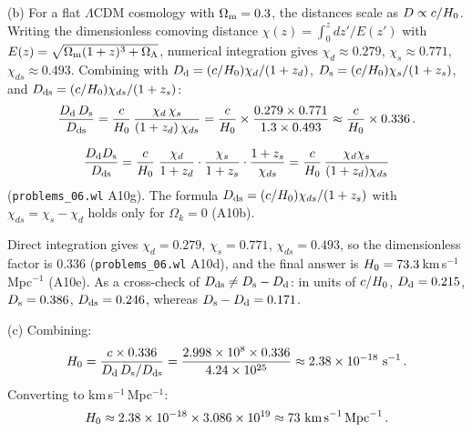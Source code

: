 (b) For a flat $\Lambda$CDM cosmology with $\Omega_{\mathrm{m}} = 0.3$, the
distances scale as $D \propto c / H_0$.  Writing the
dimensionless comoving distance $\chi(z) = \int_0^z dz'/E(z')$ with
$E(z) = \sqrt{\Omega_{\mathrm{m}}(1+z)^3 + \Omega_{\Lambda}}$, numerical integration gives
$\chi_d \approx 0.279$, $\chi_s \approx 0.771$, $\chi_{ds} \approx 0.493$.
Combining with $D_{\mathrm{d}} = (c/H_0)\chi_d/(1+z_d)$,
$D_{\mathrm{s}} = (c/H_0)\chi_s/(1+z_s)$, and
$D_{\mathrm{ds}} = (c/H_0)\chi_{ds}/(1+z_s)$:
\begin{equation*}
    \frac{D_{\mathrm{d}}\,D_{\mathrm{s}}}{D_{\mathrm{ds}}} = \frac{c}{H_0}\,
    \frac{\chi_d\,\chi_s}{(1+z_d)\,\chi_{ds}}
    = \frac{c}{H_0} \times \frac{0.279 \times 0.771}
        {1.3 \times 0.493}
    \approx \frac{c}{H_0} \times 0.336 \,.
\end{equation*}

\begin{derivation}
\[
  \frac{D_{\mathrm{d}}D_{\mathrm{s}}}{D_{\mathrm{ds}}} = \frac{c}{H_0}\;
  \frac{\chi_d}{1+z_d}\cdot\frac{\chi_s}{1+z_s}\cdot\frac{1+z_s}{\chi_{ds}}
  = \frac{c}{H_0}\,\frac{\chi_d\chi_s}{(1+z_d)\chi_{ds}}
\]
(\texttt{problems\_06.wl} A10g).  The formula $D_{\mathrm{ds}} = (c/H_0)\chi_{ds}/(1+z_s)$
with $\chi_{ds} = \chi_s-\chi_d$ holds only for $\Omega_k=0$ (A10b).
\end{derivation}

\begin{annotation}
Direct integration gives $\chi_d = 0.279$, $\chi_s = 0.771$,
$\chi_{ds} = 0.493$, so the dimensionless factor is $0.336$
(\texttt{problems\_06.wl} A10d), and the final answer is
$H_0 = 73.3$\,km\,s$^{-1}$\,Mpc$^{-1}$ (A10e).  As a cross-check of
$D_{\mathrm{ds}}\neq D_{\mathrm{s}}-D_{\mathrm{d}}$: in units of $c/H_0$, $D_{\mathrm{d}} = 0.215$,
$D_{\mathrm{s}} = 0.386$, $D_{\mathrm{ds}} = 0.246$, whereas $D_{\mathrm{s}}-D_{\mathrm{d}} = 0.171$.
\end{annotation}

(c) Combining:
\begin{equation*}
    H_0 = \frac{c \times 0.336}
    {D_{\mathrm{d}}\,D_{\mathrm{s}}/D_{\mathrm{ds}}}
    = \frac{2.998 \times 10^8 \times 0.336}{4.24 \times 10^{25}}
    \approx 2.38 \times 10^{-18}~\text{s}^{-1} \,.
\end{equation*}
Converting to km\,s$^{-1}$\,Mpc$^{-1}$:
\begin{equation*}
    H_0 \approx 2.38 \times 10^{-18} \times 3.086 \times 10^{19}
    \approx 73~\text{km\,s}^{-1}\,\text{Mpc}^{-1} \,.
\end{equation*}

